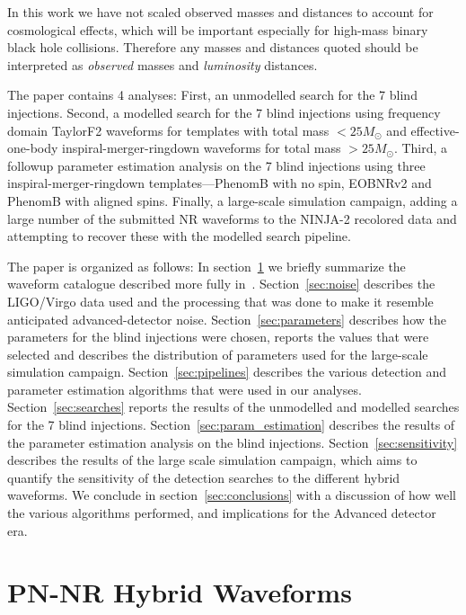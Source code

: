 \documentclass[12pt]{iopart}
\begin{document}
In this work we have not scaled observed masses and distances to account for 
cosmological effects, which will be important especially for high-mass binary 
black hole collisions. Therefore any masses and distances quoted should be 
interpreted as \emph{observed} masses and \emph{luminosity} distances.

The paper contains 4 analyses: First, an unmodelled search for the 7 blind 
injections. Second, a modelled search for the 7 blind injections using 
frequency domain TaylorF2 waveforms for templates with total mass $<25 
M_{\odot}$ and effective-one-body inspiral-merger-ringdown waveforms for total 
mass $>25 M_{\odot}$. Third, a followup parameter estimation analysis on the 7 
blind injections using three inspiral-merger-ringdown templates---PhenomB with 
no spin, EOBNRv2 and PhenomB with aligned spins. Finally, a large-scale 
simulation campaign, adding a large number of the submitted NR waveforms 
to the 
NINJA-2 recolored data and attempting to recover these with the modelled 
search pipeline. 

The paper is organized as follows:
In section~\ref{sec:waveforms} we briefly summarize the waveform
catalogue described more fully in~\cite{Ajith:2012az}.
Section~\ref{sec:noise} describes the LIGO/Virgo data used and the
processing that was done to make it resemble anticipated
advanced-detector noise.  Section~\ref{sec:parameters} describes how
the parameters for the blind injections were chosen, reports the values 
that were selected and describes the distribution of parameters used for the 
large-scale simulation campaign.
Section~\ref{sec:pipelines} describes the various detection and parameter 
estimation algorithms that were used in our analyses.
Section~\ref{sec:searches} reports the results of the unmodelled and modelled 
searches for the 7 blind injections.  Section~\ref{sec:param_estimation} 
describes the results of the parameter estimation analysis on the blind 
injections. 
Section~\ref{sec:sensitivity} describes the results of 
the large scale simulation campaign, which aims to quantify the sensitivity 
of the detection searches to the different hybrid waveforms. We conclude in 
section~\ref{sec:conclusions} with a discussion of 
how well the various algorithms performed, and implications for the
Advanced detector era.


\section{PN-NR Hybrid Waveforms}
\label{sec:waveforms}
\end{document}
